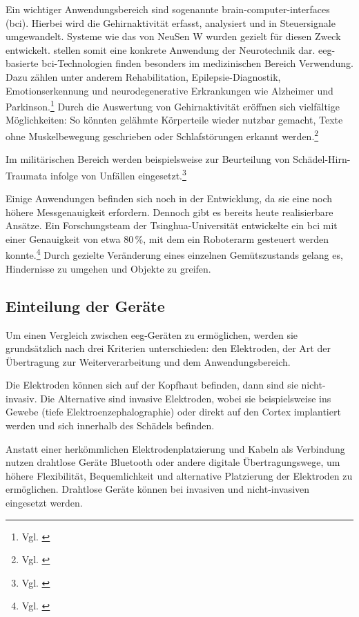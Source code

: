 Ein wichtiger Anwendungsbereich sind sogenannte \Glspl{brain-computer-interface} (\acrshort{bci}). Hierbei wird die Gehirnaktivität erfasst, analysiert und in Steuersignale umgewandelt. Systeme wie das von NeuSen W wurden gezielt für diesen Zweck entwickelt.  stellen somit eine konkrete Anwendung der Neurotechnik dar.
\acrshort{eeg}-basierte \acrshort{bci}-Technologien finden besonders im medizinischen Bereich Verwendung. Dazu zählen unter anderem Rehabilitation, Epilepsie-Diagnostik, Emotionserkennung und neurodegenerative Erkrankungen wie Alzheimer und Parkinson.\footnote{Vgl. \cite[S.~1, 3]{liu2025}} Durch die Auswertung von Gehirnaktivität eröffnen sich vielfältige Möglichkeiten: So könnten gelähmte Körperteile wieder nutzbar gemacht, Texte ohne Muskelbewegung geschrieben oder Schlafstörungen erkannt werden.\footnote{Vgl. \cite[S.~14]{liu2025}}

Im militärischen Bereich werden  beispielsweise zur Beurteilung von Schädel-Hirn-Traumata infolge von Unfällen eingesetzt.\footnote{Vgl. \cite[S.~1]{rapp2015_tbi}}

Einige Anwendungen befinden sich noch in der Entwicklung, da sie eine noch höhere Messgenauigkeit erfordern. Dennoch gibt es bereits heute realisierbare Ansätze. Ein Forschungsteam der Tsinghua-Universität entwickelte ein \acrshort{bci} mit einer Genauigkeit von etwa 80\,\%, mit dem ein Roboterarm gesteuert werden konnte.\footnote{Vgl. \cite[S.~3]{qin2023}} Durch gezielte Veränderung eines einzelnen Gemütszustands gelang es, Hindernisse zu umgehen und Objekte zu greifen.

\subsection{Einteilung der Geräte}
Um einen Vergleich zwischen \acrshort{eeg}-Geräten zu ermöglichen, werden sie grundsätzlich nach drei Kriterien unterschieden: den Elektroden, der Art der Übertragung zur Weiterverarbeitung und dem Anwendungsbereich.

Die Elektroden können sich auf der Kopfhaut befinden, dann sind sie nicht-invasiv. Die Alternative sind invasive Elektroden, wobei sie beispielsweise ins Gewebe (tiefe Elektroenzephalographie) oder direkt auf den Cortex implantiert werden und sich innerhalb des Schädels befinden.

Anstatt einer herkömmlichen Elektrodenplatzierung und Kabeln als Verbindung nutzen drahtlose Geräte Bluetooth oder andere digitale Übertragungswege, um höhere Flexibilität, Bequemlichkeit und alternative Platzierung der Elektroden zu ermöglichen. Drahtlose Geräte können bei invasiven und nicht-invasiven  eingesetzt werden.

